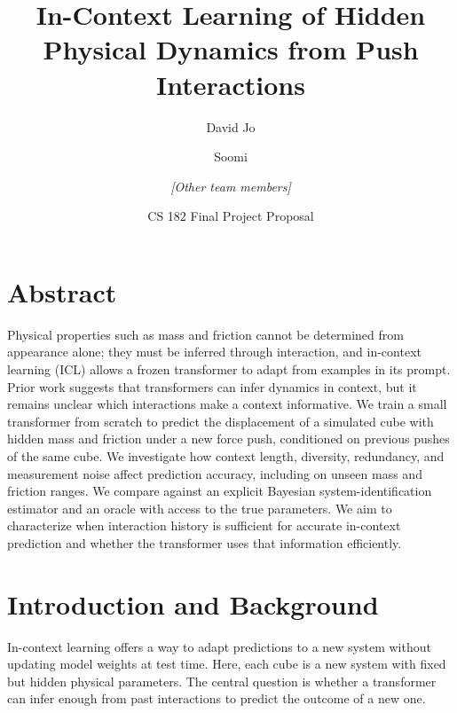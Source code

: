 \documentclass[12pt]{article}
\title{In-Context Learning of Hidden Physical Dynamics from Push Interactions}
\author{David Jo \and Soomi \and \textit{[Other team members]}}
\date{CS 182 Final Project Proposal}
\begin{document}
\maketitle

\section*{Abstract}
Physical properties such as mass and friction cannot be determined from appearance alone; they must be inferred through interaction, and in-context learning (ICL) allows a frozen transformer to adapt from examples in its prompt.
Prior work suggests that transformers can infer dynamics in context, but it remains unclear which interactions make a context informative.
We train a small transformer from scratch to predict the displacement of a simulated cube with hidden mass and friction under a new force push, conditioned on previous pushes of the same cube.
We investigate how context length, diversity, redundancy, and measurement noise affect prediction accuracy, including on unseen mass and friction ranges.
We compare against an explicit Bayesian system-identification estimator and an oracle with access to the true parameters.
We aim to characterize when interaction history is sufficient for accurate in-context prediction and whether the transformer uses that information efficiently.

\section{Introduction and Background}
In-context learning offers a way to adapt predictions to a new system without updating model weights at test time. Here, each cube is a new system with fixed but hidden physical parameters. The central question is whether a transformer can infer enough from past interactions to predict the outcome of a new one.
\end{document}
